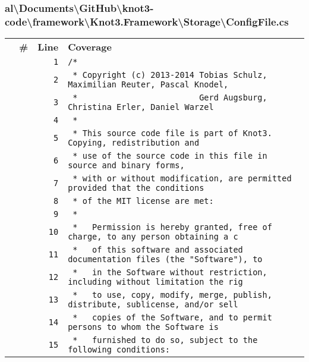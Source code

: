 \documentclass[a4paper,10pt]{article}
\begin{document}
\subsubsection{al\textbackslash Documents\textbackslash GitHub\textbackslash knot3-code\textbackslash framework\textbackslash Knot3.Framework\textbackslash Storage\textbackslash ConfigFile.cs}
\begin{longtable}[l]{lrrl}
\textbf{} & \textbf{\#} & \textbf{Line} & \textbf{Coverage}\\
\cellcolor{gray} &  & \verb~1~ & \verb~/*~\\
\cellcolor{gray} &  & \verb~2~ & \verb~ * Copyright (c) 2013-2014 Tobias Schulz, Maximilian Reuter, Pascal Knodel,~\\
\cellcolor{gray} &  & \verb~3~ & \verb~ *                         Gerd Augsburg, Christina Erler, Daniel Warzel~\\
\cellcolor{gray} &  & \verb~4~ & \verb~ *~\\
\cellcolor{gray} &  & \verb~5~ & \verb~ * This source code file is part of Knot3. Copying, redistribution and~\\
\cellcolor{gray} &  & \verb~6~ & \verb~ * use of the source code in this file in source and binary forms,~\\
\cellcolor{gray} &  & \verb~7~ & \verb~ * with or without modification, are permitted provided that the conditions~\\
\cellcolor{gray} &  & \verb~8~ & \verb~ * of the MIT license are met:~\\
\cellcolor{gray} &  & \verb~9~ & \verb~ *~\\
\cellcolor{gray} &  & \verb~10~ & \verb~ *   Permission is hereby granted, free of charge, to any person obtaining a c~\\
\cellcolor{gray} &  & \verb~11~ & \verb~ *   of this software and associated documentation files (the "Software"), to ~\\
\cellcolor{gray} &  & \verb~12~ & \verb~ *   in the Software without restriction, including without limitation the rig~\\
\cellcolor{gray} &  & \verb~13~ & \verb~ *   to use, copy, modify, merge, publish, distribute, sublicense, and/or sell~\\
\cellcolor{gray} &  & \verb~14~ & \verb~ *   copies of the Software, and to permit persons to whom the Software is~\\
\cellcolor{gray} &  & \verb~15~ & \verb~ *   furnished to do so, subject to the following conditions:~\\

\end{longtable}
\end{document}
